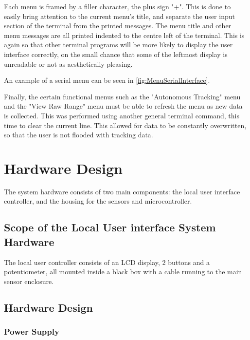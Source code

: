 \documentclass[]{report}
\begin{document}
Each menu is framed by a filler character, the plus sign "+". This is done to easily bring attention to the current menu's title, and separate the user input section of the terminal from the printed messages. The menu title and other menu messages are all printed indented to the centre left of the terminal. This is again so that other terminal programs will be more likely to display the user interface correctly, on the small chance that some of the leftmost display is unreadable or not as aesthetically pleasing.  

An example of a serial menu can be seen in \ref{fig:MenuSerialInterface}.

Finally, the certain functional menus such as the "Autonomous Tracking" menu and the "View Raw Range" menu must be able to refresh the menu as new data is collected. This was performed using another general terminal command, this time to clear the current line. This allowed for data to be constantly overwritten, so that the user is not flooded with tracking data.

\chapter{Hardware Design}
The system hardware consists of two main components: the local user interface controller, and the housing for the sensors and microcontroller.

\section{Scope of the Local User interface System Hardware}
The local user controller consists of an LCD display, 2 buttons and a potentiometer, all mounted inside a black box with a cable running to the main sensor enclosure.

\section{Hardware Design}
\subsection{Power Supply}
\end{document}
